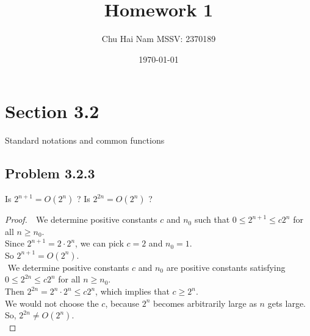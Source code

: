 \documentclass{article}
\title{Homework 1}
\author{Chu Hai Nam MSSV: 2370189}
\date\today
\begin{document}
\maketitle %

\section*{Section 3.2}
Standard notations and common functions

\subsection*{Problem 3.2.3}
Is $2^{n+1} = O(2^n)$ ? Is $2^{2n} = O(2^n)$ ?
\begin{proof}
    $ $\newline
    $ $\newline
    We determine positive constants $c$ and $n_0$ such that $0\le2^{n+1}\le c2^n$ for all $n\ge n_0$. \\
    Since $2^{n+1}=2\cdot2^n$, we can pick $c=2$ and $n_0=1$. \\
    So $2^{n+1}=O(2^n)$. \\
    $ $\newline
    We determine positive constants $c$ and $n_0$ are positive constants satisfying $0\le2^{2n}\le c2^n$ for all $n\ge n_0$. \\
    Then $2^{2n}=2^n\cdot2^n\le c2^n$, which implies that $c\ge2^n$. \\
    We would not choose the $c$, because $2^n$ becomes arbitrarily large as $n$ gets large. \\
    So, $2^{2n}\ne O(2^n)$. \\
\end{proof}

\newcommand{\Tworst}{T_{worst}(n)}
\newcommand{\Tbest}{T_{best}(n)}
\end{document}
